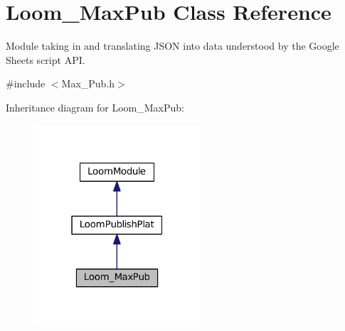\hypertarget{class_loom___max_pub}{}\section{Loom\+\_\+\+Max\+Pub Class Reference}
\label{class_loom___max_pub}


Module taking in and translating J\+S\+ON into data understood by the Google Sheets script A\+PI.  




{\ttfamily \#include $<$Max\+\_\+\+Pub.\+h$>$}



Inheritance diagram for Loom\+\_\+\+Max\+Pub\+:\nopagebreak
\begin{figure}[H]
\begin{center}
\leavevmode
\includegraphics[width=175pt]{class_loom___max_pub__inherit__graph}
\end{center}
\end{figure}
